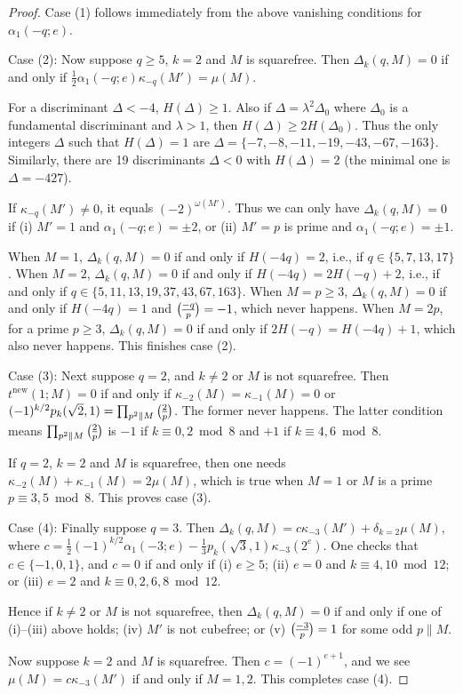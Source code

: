 \documentclass[11pt]{amsart}
\newcommand{\new}{\mathrm{new}}
\renewcommand{\mod}{\bmod}
\newcommand{\leg}{\overwithdelims ()}
\numberwithin{lem}{section}
\theoremstyle{remark}
\theoremstyle{definition}
\numberwithin{equation}{section}
\begin{document}
\begin{proof} 

Case (1) follows immediately from the above vanishing conditions for $\alpha_1(-q;e)$.

Case (2): Now suppose $q \ge 5$, $k=2$ and $M$ is squarefree.  Then $\Delta_k(q,M) = 0$ if and only if $\frac 12 \alpha_1(-q;e) \kappa_{-q}(M') = \mu(M)$.  

For a discriminant $\Delta < -4$, $H(\Delta) \ge 1$.
Also if $\Delta = \lambda^2 \Delta_0$ where $\Delta_0$ is a fundamental discriminant and $\lambda > 1$, then $H(\Delta) \ge 2 H(\Delta_0)$.  Thus the only integers $\Delta$ such that $H(\Delta) = 1$ are $\Delta = \{ -7, -8, -11, -19, -43, -67, -163 \}$.  Similarly, there are 19 discriminants $\Delta < 0$ with $H(\Delta) = 2$ (the minimal one is $\Delta = -427$).

If $\kappa_{-q}(M') \ne 0$, it equals $(-2)^{\omega(M')}$.  Thus we can only have
$\Delta_k(q,M) = 0$ if (i) $M' = 1$ and $\alpha_1(-q; e) = \pm 2$, or (ii)  $M' = p$ is prime and $\alpha_1(-q; e) = \pm 1$.  

When $M=1$, $\Delta_k(q,M) = 0$ if and only if $H(-4q) = 2$, i.e., if $q \in \{ 5, 7, 13, 17 \}$.  When $M = 2$, $\Delta_k(q,M) = 0$ if and only if $H(-4q) = 2 H(-q) + 2$, i.e., if and only if $q \in \{ 5, 11, 13, 19, 37, 43, 67, 163 \}$.
When $M = p \ge 3$, $\Delta_k(q,M) = 0$ if and only if $H(-4q) = 1$ and ${-q \leg p} = -1$, which never happens.
When $M = 2p$, for a prime $p \ge 3$, $\Delta_k(q,M) = 0$ if and only if $2H(-q) = H(-4q) + 1$, which also never happens.  This finishes case (2).

Case (3): Next suppose $q=2$, and $k \ne 2$ or $M$ is not squarefree.  Then
$t^\new(1;M) = 0$ if and only if $\kappa_{-2}(M) = \kappa_{-1}(M) = 0$
or $(-1)^{k/2} p_k(\sqrt 2,1) = \prod_{p^2 \parallel M} {2 \leg p}$.  The former never happens.  The latter condition means $\prod_{p^2 \parallel M} {2 \leg p}$ is $-1$ if $k \equiv 0, 2 \mod 8$ and $+1$ if $k \equiv 4, 6 \mod 8$.

If $q=2$, $k=2$ and $M$ is squarefree, then one needs $\kappa_{-2}(M) + \kappa_{-1}(M) = 2\mu(M)$, which is true when $M = 1$ or $M$ is a prime $p \equiv 3, 5 \mod 8$.  This proves case (3).

Case (4): Finally suppose $q=3$.  Then $\Delta_k(q,M) = c \kappa_{-3}(M') + \delta_{k=2} \mu(M)$, where $c = \frac 12(-1)^{k/2} \alpha_1(-3;e) - \frac 13 p_k(\sqrt 3,1) \kappa_{-3}(2^e)$.  One checks that $c \in \{ -1, 0, 1 \}$, and
$c = 0$ if and only if (i) $e \ge 5$; (ii) $e =  0$ and $k \equiv 4, 10 \mod 12$; or (iii) $e = 2$ and $k \equiv 0, 2, 6, 8 \mod 12$.

Hence if $k \ne 2$ or $M$ is not squarefree, then $\Delta_k(q,M) = 0$ if and only if one of (i)--(iii) above holds; (iv) $M'$ is not cubefree; or (v) ${-3 \leg p} = 1$ for some odd $p \parallel M$.

Now suppose $k=2$ and $M$ is squarefree.  Then $c = (-1)^{e+1}$, and we see $\mu(M) = c \kappa_{-3}(M')$ if and only if $M = 1, 2$.  This completes case (4).
\end{proof}
\end{document}
